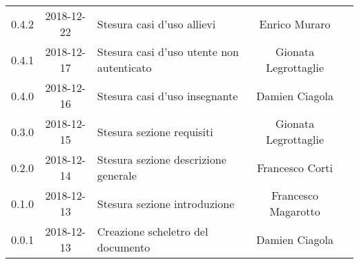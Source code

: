 {\begin{longtable}{ c c C{6cm} c c }
		0.4.2 & 
		2018-12-22 &  
		Stesura casi d'uso allievi &	
		Enrico Muraro	&	
		\reda{} \\	
		
		0.4.1 & 
		2018-12-17 &  
		Stesura casi d'uso utente non autenticato &	
		Gionata Legrottaglie &	
		\reda{} \\
		
		0.4.0 & 
		2018-12-16 &  
		Stesura casi d'uso insegnante &	
		Damien Ciagola &	
		\reda{} \\
		
		0.3.0 & 
		2018-12-15 &  
		Stesura sezione requisiti &	
		Gionata Legrottaglie &	
		\reda{} \\
		
		0.2.0 & 
		2018-12-14 &  
		Stesura sezione descrizione generale	&	
		Francesco Corti &
		\reda{} \\
		
		0.1.0 & 
		2018-12-13 &  
		Stesura sezione introduzione &	
		Francesco Magarotto &	
		\reda{}  \\
		
		0.0.1 & 
		2018-12-13 &  
		Creazione scheletro del documento&	
		Damien Ciagola  &	
		\reda{}  \\
	\end{longtable}

}